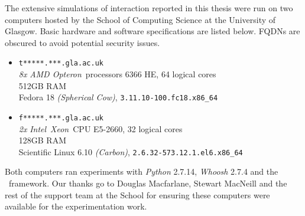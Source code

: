 
\begin{preamble}
{}

The extensive simulations of interaction reported in this thesis were run on two computers hosted by the School of Computing Science at the University of Glasgow. Basic hardware and software specifications are listed below. FQDNs are obscured to avoid potential security issues.

\begin{itemize}
    
    \item{\texttt{t*****.***.gla.ac.uk}\\\emph{8x} \emph{AMD Opteron}\texttrademark~processors 6366 HE, 64 logical cores\\512GB RAM\\Fedora 18 \emph{(Spherical Cow)}, \texttt{3.11.10-100.fc18.x86\_64}}
    
    \item{\texttt{f*****.***.gla.ac.uk}\\\emph{2x} \emph{Intel}\textregistered~\emph{Xeon}\textregistered~CPU E5-2660, 32 logical cores\\128GB RAM\\Scientific Linux 6.10 \emph{(Carbon)}, \texttt{2.6.32-573.12.1.el6.x86\_64}}
    
\end{itemize}

Both computers ran experiments with \emph{Python} 2.7.14, \emph{Whoosh} 2.7.4 and the \simiir~framework. Our thanks go to Douglas Macfarlane, Stewart MacNeill and the rest of the support team at the School for ensuring these computers were available for the experimentation work.
\end{preamble}